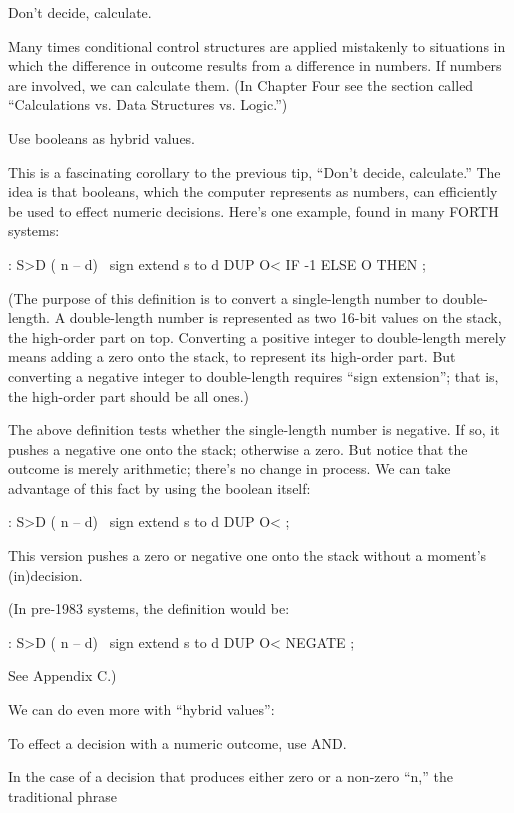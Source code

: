 \begin{tip}
Don't decide, calculate.
\end{tip}
Many times conditional control structures are applied mistakenly to
situations in which the difference in outcome results from a difference in
numbers. If numbers are involved, we can calculate them. (In Chapter
Four see the section called ``Calculations vs. Data Structures vs. Logic.'')

\begin{tip}
Use booleans as hybrid values.
\end{tip}
This is a fascinating corollary to the previous tip, ``Don't decide,
calculate.'' The idea is that booleans, which the computer represents as
numbers, can efficiently be used to effect numeric decisions. Here's one
example, found in many FORTH systems:

\begin{Code}
: S>D  ( n -- d)  \ sign extend s to d
     DUP O<  IF -1  ELSE  O THEN ;
\end{Code}
(The purpose of this definition is to convert a single-length number to
double-length. A double-length number is represented as two 16-bit
values on the stack, the high-order part on top. Converting a positive
integer to double-length merely means adding a zero onto the stack, to
represent its high-order part. But converting a negative integer to
double-length requires ``sign extension''; that is, the high-order part
should be all ones.)

The above definition tests whether the single-length number is
negative. If so, it pushes a negative one onto the stack; otherwise a zero.
But notice that the outcome is merely arithmetic; there's no change
in process. We can take advantage of this fact by using the boolean itself:

\begin{Code}
: S>D  ( n -- d)  \ sign extend s to d
     DUP  O< ;
\end{Code}
This version pushes a zero or negative one onto the stack without a
moment's (in)decision.

(In pre-1983 systems, the definition would be:

\begin{Code}
: S>D  ( n -- d)  \ sign extend s to d
     DUP  O< NEGATE ;
\end{Code}
See Appendix C.)

We can do even more with ``hybrid values'':

\begin{tip}
To effect a decision with a numeric outcome, use AND.
\end{tip}
In the case of a decision that produces either zero or a non-zero ``n,'' the
traditional phrase

